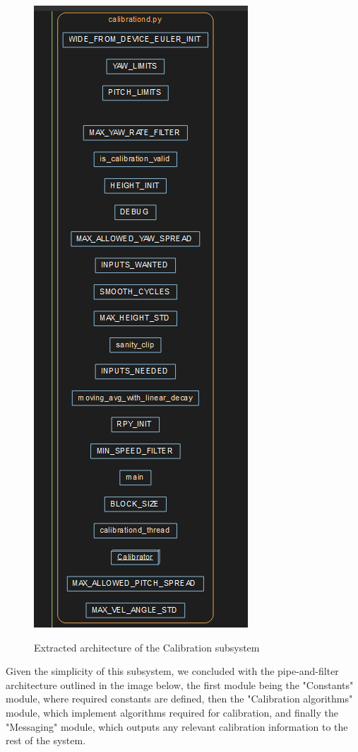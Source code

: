 \documentclass[12pt]{article}
\begin{document}
\begin{figure}[H]
    \centering
    \includegraphics[scale=0.5]{extracted-architecture-calibration.png}\\
    \caption{Extracted architecture of the Calibration subsystem}
    \label{fig:enter-label}
\end{figure}

Given the simplicity of this subsystem, we concluded with the pipe-and-filter architecture outlined in the image below, the first module being the "Constants" module, where required constants are defined, then the "Calibration algorithms" module, which implement algorithms required for calibration, and finally the "Messaging" module, which outputs any relevant calibration information to the rest of the system. 
\end{document}
